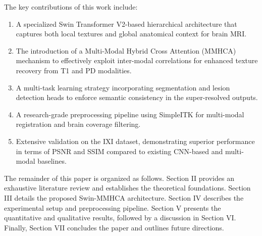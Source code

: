\documentclass{IEEEoj}
\begin{document}
The key contributions of this work include:
\begin{enumerate}
    \item A specialized Swin Transformer V2-based hierarchical architecture that captures both local textures and global anatomical context for brain MRI.
    \item The introduction of a Multi-Modal Hybrid Cross Attention (MMHCA) mechanism to effectively exploit inter-modal correlations for enhanced texture recovery from T1 and PD modalities.
    \item A multi-task learning strategy incorporating segmentation and lesion detection heads to enforce semantic consistency in the super-resolved outputs.
    \item A research-grade preprocessing pipeline using SimpleITK for multi-modal registration and brain coverage filtering.
    \item Extensive validation on the IXI dataset, demonstrating superior performance in terms of PSNR and SSIM compared to existing CNN-based and multi-modal baselines.
\end{enumerate}

The remainder of this paper is organized as follows. Section II provides an exhaustive literature review and establishes the theoretical foundations. Section III details the proposed Swin-MMHCA architecture. Section IV describes the experimental setup and preprocessing pipeline. Section V presents the quantitative and qualitative results, followed by a discussion in Section VI. Finally, Section VII concludes the paper and outlines future directions.
\end{document}
